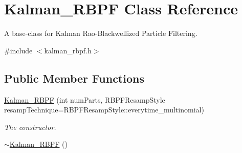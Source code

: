 \hypertarget{classKalman__RBPF}{}\section{Kalman\+\_\+\+R\+B\+PF Class Reference}
\label{classKalman__RBPF}


A base-\/class for Kalman Rao-\/\+Blackwellized Particle Filtering.  




{\ttfamily \#include $<$kalman\+\_\+rbpf.\+h$>$}

\subsection*{Public Member Functions}
\begin{DoxyCompactItemize}
\item 
\hyperlink{classKalman__RBPF_aa7130565819b45f993100dbf7f048c37}{Kalman\+\_\+\+R\+B\+PF} (int num\+Parts, R\+B\+P\+F\+Resamp\+Style resamp\+Technique=R\+B\+P\+F\+Resamp\+Style\+::everytime\+\_\+multinomial)
\begin{DoxyCompactList}\small\item\em The constructor. \end{DoxyCompactList}\item 
\hyperlink{classKalman__RBPF_a454f1736e8889904f755ca904f6eebc0}{$\sim$\+Kalman\+\_\+\+R\+B\+PF} ()\hypertarget{classKalman__RBPF_a454f1736e8889904f755ca904f6eebc0}{}\label{classKalman__RBPF_a454f1736e8889904f755ca904f6eebc0}


\end{DoxyCompactItemize}
